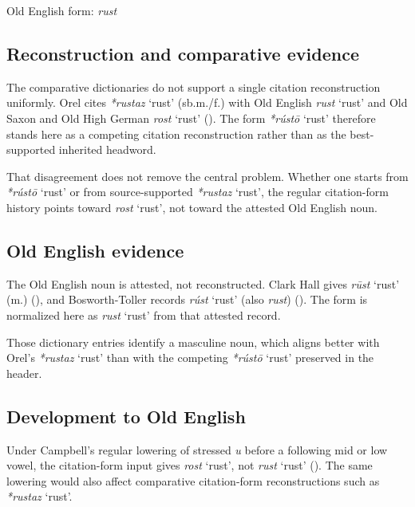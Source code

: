 \documentclass[
  british,
  a4paper,
  openany]{book}
\providecommand{\Recon}[1]{\emph{*#1}}
{\catcode`→=\active \global\def→{\ensuremath{\rightarrow}}}
\providecommand{\Recon}[1]{\emph{*#1}}
{\catcode`→=\active \global\def→{\ensuremath{\rightarrow}}}
\begin{document}
Old English form: \emph{rust}

\subsection{Reconstruction and comparative
evidence}\label{reconstruction-and-comparative-evidence-144}

The comparative dictionaries do not support a single citation
reconstruction uniformly. Orel cites \Recon{rustaz} `rust' (sb.m./f.)
with Old English {\emph{rust}} `rust' and Old Saxon and Old High German
\emph{rost} `rust' (). The form
\Recon{rústō} `rust' therefore stands here as a competing citation
reconstruction rather than as the best-supported inherited headword.

That disagreement does not remove the central problem. Whether one
starts from \Recon{rústō} `rust' or from source-supported \Recon{rustaz}
`rust', the regular citation-form history points toward \emph{rost}
`rust', not toward the attested Old English noun.

\subsection{Old English evidence}\label{old-english-evidence-144}

The Old English noun is attested, not reconstructed. Clark Hall gives
{\emph{rūst}} `rust' (m.) (), and Bosworth-Toller records {\emph{rúst}} `rust' (also
\emph{rust}) (). The form is normalized here as {\emph{rust}} `rust' from
that attested record.

Those dictionary entries identify a masculine noun, which aligns better
with Orel's \Recon{rustaz} `rust' than with the competing \Recon{rústō}
`rust' preserved in the header.

\subsection{Development to Old
English}\label{development-to-old-english-144}

Under Campbell's regular lowering of stressed \emph{u} before a
following mid or low vowel, the citation-form input gives \emph{rost}
`rust', not {\emph{rust}} `rust' (). The same lowering would also affect comparative
citation-form reconstructions such as \Recon{rustaz} `rust'.
\end{document}
